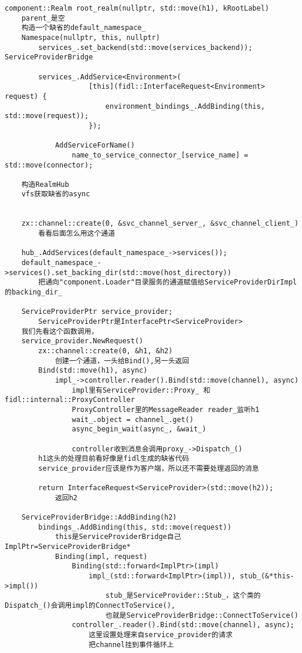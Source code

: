 \begin{verbatim}
component::Realm root_realm(nullptr, std::move(h1), kRootLabel)
    parent_是空
    构造一个缺省的default_namespace_
    Namespace(nullptr, this, nullptr)
        services_.set_backend(std::move(services_backend));   ServiceProviderBridge

        services_.AddService<Environment>(
                    [this](fidl::InterfaceRequest<Environment> request) {
                        environment_bindings_.AddBinding(this, std::move(request));
                    });

            AddServiceForName()
                name_to_service_connector_[service_name] = std::move(connector);

    构造RealmHub
    vfs获取缺省的async


    zx::channel::create(0, &svc_channel_server_, &svc_channel_client_)
        看看后面怎么用这个通道
    
    hub_.AddServices(default_namespace_->services());
    default_namespace_->services().set_backing_dir(std::move(host_directory))
        把通向"component.Loader"目录服务的通道赋值给ServiceProviderDirImpl的backing_dir_
      
    ServiceProviderPtr service_provider;
        ServiceProviderPtr是InterfacePtr<ServiceProvider>
    我们先看这个函数调用，
    service_provider.NewRequest()
        zx::channel::create(0, &h1, &h2)
            创建一个通道，一头给Bind(),另一头返回
        Bind(std::move(h1), async) 
            impl_->controller.reader().Bind(std::move(channel), async)
                impl里有ServiceProvider::Proxy_ 和  fidl::internal::ProxyController
                ProxyController里的MessageReader reader_监听h1
                wait_.object = channel_.get()
                async_begin_wait(async_, &wait_)

                controller收到消息会调用proxy_->Dispatch_()
        h1这头的处理目前看好像是fidl生成的缺省代码
        service_provider应该是作为客户端，所以还不需要处理返回的消息
        
        return InterfaceRequest<ServiceProvider>(std::move(h2));
            返回h2

    ServiceProviderBridge::AddBinding(h2)
        bindings_.AddBinding(this, std::move(request))
            this是ServiceProviderBridge自己 ImplPtr=ServiceProviderBridge*
            Binding(impl, request)
                Binding(std::forward<ImplPtr>(impl)
                    impl_(std::forward<ImplPtr>(impl)), stub_(&*this->impl())
                        stub_是ServiceProvider::Stub_，这个类的Dispatch_()会调用impl的ConnectToService(),
                        也就是ServiceProviderBridge::ConnectToService()
                controller_.reader().Bind(std::move(channel), async);
                    这里设置处理来自service_provider的请求
                    把channel挂到事件循环上
            

\end{verbatim}
